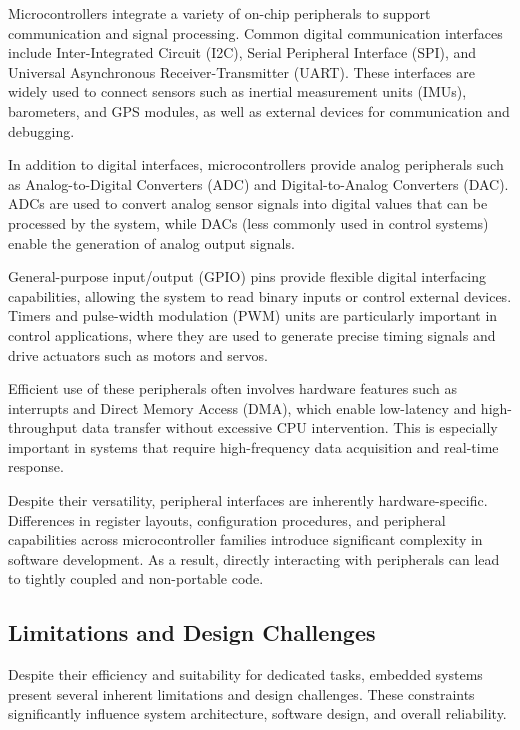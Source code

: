 Microcontrollers integrate a variety of on-chip peripherals to support communication and signal processing. Common digital communication interfaces include Inter-Integrated Circuit (I2C), Serial Peripheral Interface (SPI), and Universal Asynchronous Receiver-Transmitter (UART). These interfaces are widely used to connect sensors such as inertial measurement units (IMUs), barometers, and GPS modules, as well as external devices for communication and debugging.

In addition to digital interfaces, microcontrollers provide analog peripherals such as Analog-to-Digital Converters (ADC) and Digital-to-Analog Converters (DAC). ADCs are used to convert analog sensor signals into digital values that can be processed by the system, while DACs (less commonly used in control systems) enable the generation of analog output signals.

General-purpose input/output (GPIO) pins provide flexible digital interfacing capabilities, allowing the system to read binary inputs or control external devices. Timers and pulse-width modulation (PWM) units are particularly important in control applications, where they are used to generate precise timing signals and drive actuators such as motors and servos.

Efficient use of these peripherals often involves hardware features such as interrupts and Direct Memory Access (DMA), which enable low-latency and high-throughput data transfer without excessive CPU intervention. This is especially important in systems that require high-frequency data acquisition and real-time response.

Despite their versatility, peripheral interfaces are inherently hardware-specific. Differences in register layouts, configuration procedures, and peripheral capabilities across microcontroller families introduce significant complexity in software development. As a result, directly interacting with peripherals can lead to tightly coupled and non-portable code.

\subsection{Limitations and Design Challenges}

Despite their efficiency and suitability for dedicated tasks, embedded systems present several inherent limitations and design challenges. These constraints significantly influence system architecture, software design, and overall reliability.

